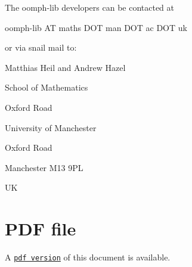 The {\ttfamily oomph-\/lib} developers can be contacted at \begin{center} {\ttfamily  oomph-\/lib A\-T maths D\-O\-T man D\-O\-T ac D\-O\-T uk } \end{center} 

or via snail mail to\-:

{\ttfamily  Matthias Heil and Andrew Hazel \par
 School of Mathematics \par
 Oxford Road \par
 University of Manchester \par
 Oxford Road \par
 Manchester M13 9\-P\-L \par
 U\-K }



 

 \hypertarget{index_pdf}{}\section{P\-D\-F file}\label{index_pdf}
A \href{../latex/refman.pdf}{\tt pdf version} of this document is available. 